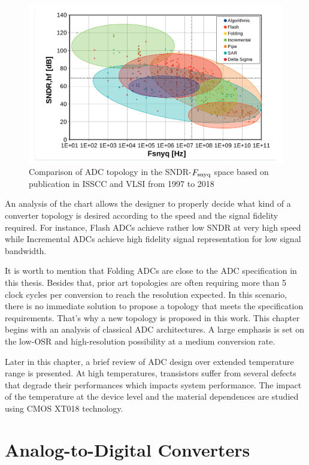 \begin{figure}[htp]
	\centering
	\includegraphics[width=.8\textwidth]{Chapter2/Figs/Vector/sndr_fsnyq_topology.pdf}
	\caption{Comparison of ADC topology in the SNDR-$F_{\rm snyq}$ space based on publication in ISSCC and VLSI from 1997 to 2018~\cite{MurmannSurvey}}
	\label{fig:topology-sndr-fsnyq-comparison}
\end{figure}
An analysis of the chart allows the designer to properly decide what kind of a converter topology is desired according to the speed and the signal fidelity required. For instance, Flash ADCs achieve rather low SNDR at very high speed while Incremental ADCs achieve high fidelity signal representation for low signal bandwidth.

It is worth to mention that Folding ADCs are close to the ADC specification in this thesis. Besides that, prior art topologies are often requiring more than 5 clock cycles per conversion to reach the resolution expected. In this scenario, there is no immediate solution to propose a topology that meets the specification requirements. That's why a new topology is proposed in this work. This chapter begins with an analysis of classical ADC architectures. A large emphasis is set on the low-OSR and high-resolution possibility at a medium conversion rate.

Later in this chapter, a brief review of ADC design over extended temperature range is presented. At high temperatures, transistors suffer from several defects that degrade their performances which impacts system performance. The impact of the temperature at the device level and the material dependences are studied using CMOS XT018 technology. 

\section{Analog-to-Digital Converters}
